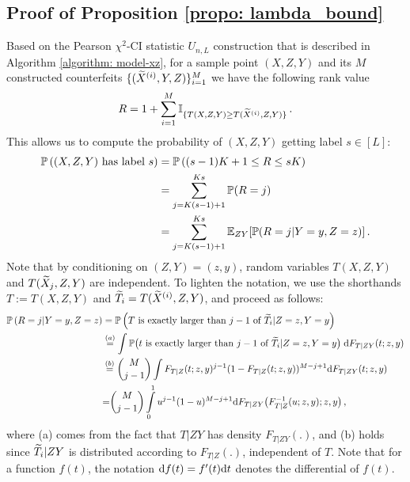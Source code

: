 \documentclass[11pt]{article}
\def\partu{\frac{\partial}{\partial u}}
\def\partt{\frac{\partial}{\partial t}}
\begin{document}
	
	
	
\subsection{Proof of Proposition \ref{propo: lambda_bound}}\label{proof:propo: lambda_bound}

Based on the Pearson $\chi^2$-CI statistic $U_{n,L}$ construction that is described in Algorithm \ref{algorithm: model-xz}, for a sample point $(X,Z,Y)$ and its $M$ constructed counterfeits $\{({\widetilde{X}}^{(i)},Y,Z)\}_{i=1}^M$ we have the following rank value 
\[
R=1+\sum\limits_{i=1}^{M}{\mathbb I}_{ \{ T(X,Z,Y) \geq T({\widetilde{X}}^{(i)},Z,Y)  \}} \,.
\]
This allows us to compute the  probability of $(X,Z,Y)$ getting label $s\in[L]$:
\begin{align}
	{\mathbb P}\left((X,Z,Y)\text{ has label } s \right)&={\mathbb P}\left((s-1)K+1 \leq R\leq sK\right)\nonumber\\
	&=\sum\limits_{j=K(s-1)+1}^{Ks}{\mathbb P}(R=j)\nonumber\\
	&=\sum\limits_{j=K(s-1)+1}^{Ks}{\mathbb E}_{ZY}[{\mathbb P}(R=j|Y=y,Z=z)]\label{eq:Ryz}\,.
\end{align}
%
Note that by conditioning on $(Z,Y)=(z,y)$, random variables $T(X,Z,Y)$ and $T({\widetilde{X}}_j,Z,Y)$ are independent. To lighten the notation, we use the shorthands $T:=T(X,Z,Y)$ and $\widetilde{T}_i=T({\widetilde{X}}^{(i)},Z,Y)$, and proceed as follows:
\begin{align}
	{\mathbb P}\left( R=j|Y=y,Z=z \right)&= {\mathbb P}\left( T \text{ is exactly larger than } j-1\text{ of } \widetilde{T}_i  |Z=z,Y=y \right)\nonumber\\
	&\overset{(a)}{=}\int {\mathbb P}\big( t \text{ is exactly larger than } j-1\text{ of } \widetilde{T}_i  |Z=z,Y=y \big)\; {\rm d} F_{T|ZY}(t;z,y)\nonumber\\
	&\overset{(b)}{=}\binom{M}{j-1} \int F_{T|Z}(t;z,y)^{j-1}(1-F_{T|Z}(t;z,y))^{M-j+1}{\rm d} F_{T|ZY}(t;z,y)\nonumber \\
	&{=}\binom{M}{j-1}\int\limits_{0}^{1} u^{j-1}(1-u)^{M-j+1}{\rm d} F_{T|ZY}\big(F_{T|Z}^{-1}(u;z,y);z,y\big)\label{eq: tmp6} \,,
\end{align}
where (a) comes from the fact that $T|ZY$ has density $F_{T|ZY}(.)$, and (b) holds since $\widetilde{T}_i|ZY$ is distributed according to $F_{T|Z}(.)$, independent of $T$.  Note that for a function $f(t)$, the notation ${\rm d} f(t)  =f'(t){\rm d} t$ denotes the differential of $f(t)$.
\end{document}
